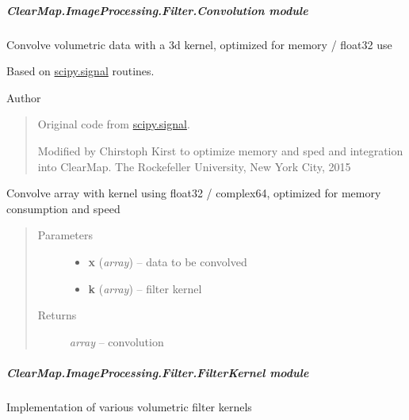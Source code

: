 \documentclass[letterpaper,10pt,english]{sphinxmanual}
\begin{document}
\subparagraph{ClearMap.ImageProcessing.Filter.Convolution module}
\label{api/ClearMap.ImageProcessing.Filter:module-ClearMap.ImageProcessing.Filter.Convolution}\label{api/ClearMap.ImageProcessing.Filter:clearmap-imageprocessing-filter-convolution-module}
Convolve volumetric data with a 3d kernel, optimized for memory / float32 use

Based on \href{http://docs.scipy.org/doc/scipy/reference/signal.html}{scipy.signal}
routines.

Author
\begin{quote}

Original code from \href{http://docs.scipy.org/doc/scipy/reference/signal.html}{scipy.signal}.

Modified by Chirstoph Kirst to optimize memory and sped and integration into ClearMap.
The Rockefeller University, New York City, 2015
\end{quote}

\begin{fulllineitems}
\label{api/ClearMap.ImageProcessing.Filter:ClearMap.ImageProcessing.Filter.Convolution.convolve}
Convolve array with kernel using float32 / complex64, optimized for memory consumption and speed
\begin{quote}\begin{description}
\item[{Parameters}] \leavevmode\begin{itemize}
\item {} 
\textbf{x} (\emph{array}) --
data to be convolved

\item {} 
\textbf{k} (\emph{array}) --
filter kernel

\end{itemize}

\item[{Returns}] \leavevmode
\emph{array} --
convolution

\end{description}\end{quote}

\end{fulllineitems}



\subparagraph{ClearMap.ImageProcessing.Filter.FilterKernel module}
\label{api/ClearMap.ImageProcessing.Filter:clearmap-imageprocessing-filter-filterkernel-module}\label{api/ClearMap.ImageProcessing.Filter:module-ClearMap.ImageProcessing.Filter.FilterKernel}
Implementation of various volumetric filter kernels
\end{document}
